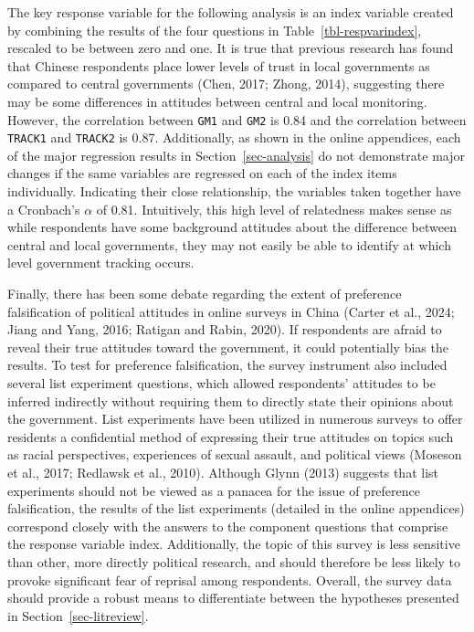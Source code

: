 \documentclass[
  letterpaper,
  DIV=11,
  numbers=noendperiod]{scrartcl}
\begin{document}
The key response variable for the following analysis is an index
variable created by combining the results of the four questions in
Table~\ref{tbl-respvarindex}, rescaled to be between zero and one. It is
true that previous research has found that Chinese respondents place
lower levels of trust in local governments as compared to central
governments (Chen, 2017; Zhong, 2014), suggesting there may be some
differences in attitudes between central and local monitoring. However,
the correlation between \texttt{GM1} and \texttt{GM2} is 0.84 and the
correlation between \texttt{TRACK1} and \texttt{TRACK2} is 0.87.
Additionally, as shown in the online appendices, each of the major
regression results in Section~\ref{sec-analysis} do not demonstrate
major changes if the same variables are regressed on each of the index
items individually. Indicating their close relationship, the variables
taken together have a Cronbach's \(\alpha\) of 0.81. Intuitively, this
high level of relatedness makes sense as while respondents have some
background attitudes about the difference between central and local
governments, they may not easily be able to identify at which level
government tracking occurs.

Finally, there has been some debate regarding the extent of preference
falsification of political attitudes in online surveys in China (Carter
et al., 2024; Jiang and Yang, 2016; Ratigan and Rabin, 2020). If
respondents are afraid to reveal their true attitudes toward the
government, it could potentially bias the results. To test for
preference falsification, the survey instrument also included several
list experiment questions, which allowed respondents' attitudes to be
inferred indirectly without requiring them to directly state their
opinions about the government. List experiments have been utilized in
numerous surveys to offer residents a confidential method of expressing
their true attitudes on topics such as racial perspectives, experiences
of sexual assault, and political views (Moseson et al., 2017; Redlawsk
et al., 2010). Although Glynn (2013) suggests that list experiments
should not be viewed as a panacea for the issue of preference
falsification, the results of the list experiments (detailed in the
online appendices) correspond closely with the answers to the component
questions that comprise the response variable index. Additionally, the
topic of this survey is less sensitive than other, more directly
political research, and should therefore be less likely to provoke
significant fear of reprisal among respondents. Overall, the survey data
should provide a robust means to differentiate between the hypotheses
presented in Section~\ref{sec-litreview}.
\end{document}
